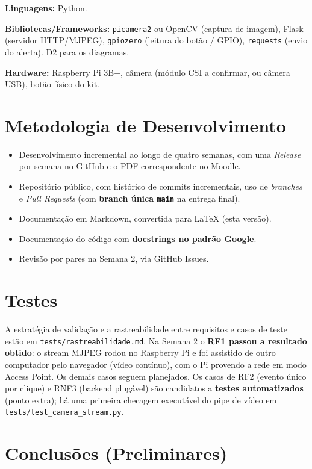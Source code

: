 \documentclass[12pt,a4paper]{article}
\begin{document}
\textbf{Linguagens:} Python.

\textbf{Bibliotecas/Frameworks:} \texttt{picamera2} ou OpenCV (captura de imagem),
Flask (servidor HTTP/MJPEG), \texttt{gpiozero} (leitura do botão / GPIO),
\texttt{requests} (envio do alerta). D2 para os diagramas.

\textbf{Hardware:} Raspberry Pi 3B+, câmera (módulo CSI a confirmar, ou câmera
USB), botão físico do kit.

\section{Metodologia de Desenvolvimento}
\begin{itemize}[nosep]
  \item Desenvolvimento incremental ao longo de quatro semanas, com uma
        \textit{Release} por semana no GitHub e o PDF correspondente no Moodle.
  \item Repositório público, com histórico de commits incrementais, uso de
        \textit{branches} e \textit{Pull Requests} (com \textbf{branch única
        \texttt{main}} na entrega final).
  \item Documentação em Markdown, convertida para LaTeX (esta versão).
  \item Documentação do código com \textbf{docstrings no padrão Google}.
  \item Revisão por pares na Semana 2, via GitHub Issues.
\end{itemize}

\section{Testes}

A estratégia de validação e a rastreabilidade entre requisitos e casos de teste
estão em \texttt{tests/rastreabilidade.md}. Na Semana 2 o \textbf{RF1 passou a
resultado obtido}: o stream MJPEG rodou no Raspberry Pi e foi assistido de outro
computador pelo navegador (vídeo contínuo), com o Pi provendo a rede em modo
Access Point. Os demais casos seguem planejados. Os casos de RF2 (evento único
por clique) e RNF3 (backend plugável) são candidatos a \textbf{testes
automatizados} (ponto extra); há uma primeira checagem executável do pipe de
vídeo em \texttt{tests/test\_camera\_stream.py}.

\section{Conclusões (Preliminares)}
\end{document}

